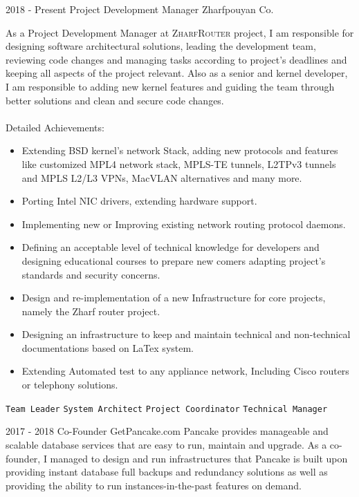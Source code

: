 \documentclass[12pt]{developercv}
\begin{document}
\begin{entrylist}
	\entry
		{2018 - Present}
		{Project Development Manager}
		{Zharfpouyan Co.}
		{
		As a Project Development Manager at \textsc{ZharfRouter} project,
		I am responsible for designing software architectural solutions,
		leading the development team, reviewing code changes and managing
		tasks according to project's deadlines and keeping all aspects of
		the project relevant. Also as a senior and kernel developer,
		I am responsible to adding new kernel features and guiding the
		team through better solutions and clean and secure code changes.
		\\
		\\
		Detailed Achievements:
		\begin{itemize}
			\item Extending BSD kernel's network Stack, adding new protocols
			      and features like customized MPL4 network stack,
			      MPLS-TE tunnels, L2TPv3 tunnels and MPLS L2/L3 VPNs,
			      MacVLAN alternatives and many more.
			\item Porting Intel NIC drivers, extending hardware support.
			\item Implementing  new or Improving existing network routing
			      protocol daemons.
			\item Defining an acceptable level of technical knowledge for
			      developers and designing educational courses to prepare
			      new comers adapting project's standards and security concerns.
			\item Design and re-implementation of a new Infrastructure for
				  core projects, namely the Zharf router project.
			\item Designing an infrastructure to keep and maintain technical and
				  non-technical documentations based on LaTex system.
			\item Extending Automated test to any appliance network, Including
			      Cisco routers or telephony solutions.
		\end{itemize}
		\texttt{Team Leader}\slashsep
		\texttt{System Architect}\slashsep
		\texttt{Project Coordinator}\slashsep
		\texttt{Technical Manager}
		}
	\entry
		{2017 - 2018}
		{Co-Founder}
		{GetPancake.com}
		{
		Pancake provides manageable and scalable database services that
		are easy to run, maintain and upgrade. As a co-founder, I managed
		to design and run infrastructures that Pancake is built upon providing
		instant database full backups and redundancy solutions as well as
		providing the ability to run instances-in-the-past features on demand.
}
\end{entrylist}
\end{document}

